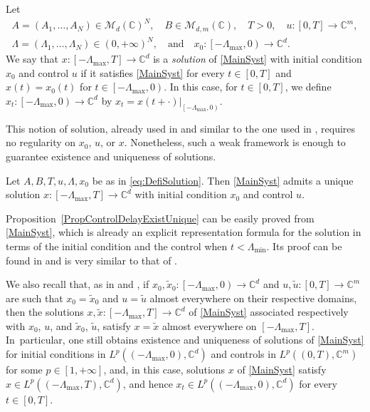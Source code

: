 \begin{defi}
\label{DefiSolution}
Let
\begin{equation}\label{eq:DefiSolution}
\begin{gathered}
A = (A_1, \dots, A_N) \in \mathcal M_d(\mathbb C)^N,\quad B \in \mathcal M_{d, m}(\mathbb C),\quad T > 0,\quad
u: [0, T] \to \mathbb C^m,\\
\Lambda = (\Lambda_1, \dots, \Lambda_N) \in (0, +\infty)^N,\quad \text{and}\quad x_0: \left[-\Lambda_{\max}, 0\right) \to \mathbb C^d.
\end{gathered}
\end{equation}
We say that $x: \left[-\Lambda_{\max}, T\right] \to \mathbb C^d$ is a \emph{solution} of \eqref{MainSyst} with initial condition $x_0$ and control $u$ if it satisfies \eqref{MainSyst} for every $t \in [0, T]$ and $x(t) = x_0(t)$ for $t \in \left[-\Lambda_{\max}, 0\right)$. In this case, for $t \in [0, T]$, we define $x_t: \left[-\Lambda_{\max}, 0\right) \to \mathbb C^d$ by $x_t = x(t + \cdot)|_{\left[-\Lambda_{\max}, 0\right)}$.
\end{defi}

This notion of solution, already used in \cite{Mazanti2017Relative} and similar to the one used in \cite{Chitour2016Stability}, requires no regularity on $x_0$, $u$, or $x$. Nonetheless, such a weak framework is enough to guarantee existence and uniqueness of solutions.

\begin{prop}
\label{PropControlDelayExistUnique}
Let $A,B,T,u,\Lambda,x_0$ be as in \eqref{eq:DefiSolution}. Then \eqref{MainSyst} admits a unique solution $x: \left[-\Lambda_{\max}, T\right] \to \mathbb C^d$ with initial condition $x_0$ and control $u$.
\end{prop}

Proposition~\ref{PropControlDelayExistUnique} can be easily proved from \eqref{MainSyst}, which is already an explicit representation formula for the solution in terms of the initial condition and the control when $t < \Lambda_{\min}$. Its proof can be found in \cite[Prop.\,2.2]{Mazanti2017Relative} and is very similar to that of \cite[Prop.\,3.2]{Chitour2016Stability}.

We also recall that, as in \cite[Rem.\,3.4]{Chitour2016Stability} and \cite[Rem.\,2.3]{Mazanti2017Relative}, if $x_0, \widetilde x_0: \left[-\Lambda_{\max}, 0\right) \to \mathbb C^d$ and $u, \widetilde u: [0, T] \to \mathbb C^m$ are such that $x_0 = \widetilde x_0$ and $u = \widetilde u$ almost everywhere on their respective domains, then the solutions $x, \widetilde x: \left[-\Lambda_{\max}, T\right] \to \mathbb C^d$ of \eqref{MainSyst} associated respectively with $x_0$, $u$, and $\widetilde x_0$, $\widetilde u$, satisfy $x = \widetilde x$ almost everywhere on $\left[-\Lambda_{\max}, T\right]$. In~particular, one still obtains existence and uniqueness of solutions of \eqref{MainSyst} for initial conditions in $L^p((-\Lambda_{\max}, 0), \mathbb C^d)$ and controls in $L^p((0, T), \mathbb C^m)$ for some $p \in [1, +\infty]$, and, in this case, solutions $x$ of \eqref{MainSyst} satisfy $x \in L^p(\left(-\Lambda_{\max}, T\right), \mathbb C^d)$, and hence $x_t \in L^p((-\Lambda_{\max}, 0), \mathbb C^d)$ for every $t \in [0, T]$.

